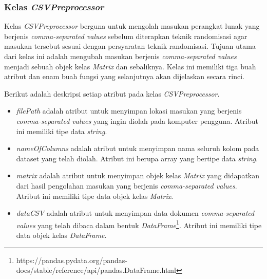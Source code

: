 \subsubsection{Kelas \textit{CSVPreprocessor}}
\label{subsubsec:kelas-csvpreprocessor}

Kelas \textit{CSVPreprocessor} berguna untuk mengolah masukan perangkat lunak yang berjenis \textit{comma-separated values} sebelum diterapkan teknik randomisasi agar masukan tersebut sesuai dengan persyaratan teknik randomisasi. Tujuan utama dari kelas ini adalah mengubah masukan berjenis \textit{comma-separated values} menjadi sebuah objek kelas \textit{Matrix} dan sebaliknya. Kelas ini memiliki tiga buah atribut dan enam buah fungsi yang selanjutnya akan dijelaskan secara rinci.

Berikut adalah deskripsi setiap atribut pada kelas \textit{CSVPreprocessor}.
\begin{itemize}
	\item \textit{filePath} adalah atribut untuk menyimpan lokasi masukan yang berjenis \textit{comma-separated values} yang ingin diolah pada komputer pengguna. Atribut ini memiliki tipe data \textit{string}.
	\item \textit{nameOfColumns} adalah atribut untuk menyimpan nama seluruh kolom pada dataset yang telah diolah. Atribut ini berupa array yang bertipe data \textit{string}.
	\item \textit{matrix} adalah atribut untuk menyimpan objek kelas \textit{Matrix} yang didapatkan dari hasil pengolahan masukan yang berjenis \textit{comma-separated values}. Atribut ini memiliki tipe data objek kelas \textit{Matrix}.
	\item \textit{dataCSV} adalah atribut untuk menyimpan data dokumen \textit{comma-separated values} yang telah dibaca dalam bentuk \textit{DataFrame}\footnote{https://pandas.pydata.org/pandas-docs/stable/reference/api/pandas.DataFrame.html}. Atribut ini memiliki tipe data objek kelas \textit{DataFrame}.
\end{itemize}

